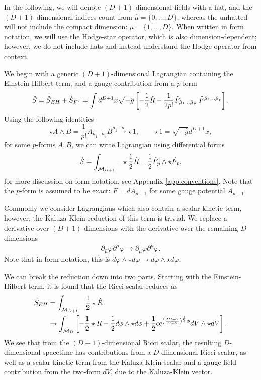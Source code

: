 In the following, we will denote $(D+1)$-dimensional fields with a hat, and the $(D+1)$-dimensional indices count from $\hat{\mu} = \{0, \ldots, D \}$, whereas the unhatted will not include the compact dimension: $\mu = \{1, \ldots, D \}$. When written in form notation, we will use the Hodge-star operator, which is also dimension-dependent; however, we do not include hats and instead understand the Hodge operator from context.

We begin with a generic $(D + 1)$-dimensional Lagrangian containing the Einstein-Hilbert term, and a gauge contribution from a $p$-form
\begin{equation*}
	\hat{S} = \hat{S}_{EH} + \hat{S}_{F^2} = \int d^{D+1} x \sqrt{-\hat{g}} \left[ - \frac{1}{2} \hat{R} - \frac{1}{2 p!} \hat{F}_{\hat{\mu}_1 \ldots \hat{\mu}_p}\; \hat{F}^{\hat{\mu}_1 \ldots \hat{\mu}_p } \right].
\end{equation*}
Using the following identities
\begin{equation*}
 \star A \wedge B = \frac{1}{p!} A_{\mu_1 \ldots \mu_p} B^{\mu_1 \ldots \mu_p} \star 1, \qquad  \star 1 = \sqrt{-\hat{g}} d^{D+1} x,
\end{equation*}
for some $p$-forms $A, B$, we can write Lagrangian using differential forms
\begin{equation*}
	\hat{S} = \int_{{\cal M}_{D+1}}  -\star \frac{1}{2} \hat{R} - \frac{1}{2} \hat{F}_p \wedge \star \hat{F}_p,
\end{equation*}
for more discussion on form notation, see Appendix \ref{app:conventions}. Note that the $p$-form is assumed to be exact: $F = dA_{p-1}$ for some gauge potential $A_{p-1}$. 

Commonly we consider Lagrangians which also contain a scalar kinetic term, however, the Kaluza-Klein reduction of this term is trivial. We replace a derivative over $(D+1)$ dimensions with the derivative over the remaining $D$ dimensions
\begin{equation*}
	\partial_{\hat{\mu}} \varphi \partial^{\hat{\mu}} \varphi \rightarrow \partial_{\mu} \varphi \partial^{\mu} \varphi.
\end{equation*}
Note that in form notation, this is $d\varphi \wedge \star d\varphi \rightarrow d\varphi \wedge \star d\varphi$.

We can break the reduction down into two parts. Starting with the Einstein-Hilbert term, it is found that the Ricci scalar reduces as
\begin{equation}
\label{eq:dimeh}
\begin{aligned}
	\hat{S}_{EH} &= \int_{{\cal M}_{D+1}} -\frac{1}{2} \star \hat{R}  \\
	&\to \int_{{\cal M}_D} \left[ - \frac{1}{2} \star R - \frac{1}{2} d \phi \wedge \star d\phi + \frac{1}{2} \epsilon e^{\left( \frac{2D-2}{D-2} \right)^{\frac{1}{2}} \phi} dV \wedge \star dV \right].
\end{aligned}
\end{equation}
We see that from the $(D+1)$-dimensional Ricci scalar, the resulting $D$-dimensional spacetime has contributions from a $D$-dimensional Ricci scalar, as well as a scalar kinetic term from the Kaluza-Klein scalar and a gauge field contribution from the two-form $dV$, due to the Kaluza-Klein vector.


